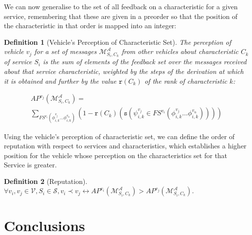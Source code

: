 \documentclass[compsoc, conference, letterpaper, 10pt, times]{IEEEtran}
\newtheorem{definition}{Definition}
\begin{document}
We can now generalise to the set of all feedback on a characteristic for a given service, remembering that these are given in a preorder so that the position of the characteristic in that order is mapped into an integer:


\begin{definition}[Vehicle's Perception of Characteristic Set]
The perception of vehicle $v_{j}$ for a set of messages $\mathcal{M}^{\mathcal{A}}_{S_{i},C_{k}}$ from other vehicles about characteristic $C_{k}$ of service $S_{i}$ is the sum of elements of the feedback set over the messages received about that service characteristic, weighted by the steps of the derivation at which it is obtained and further by the value $\mathtt{r}(C_{k})$ of the rank of characteristic $k$: 


\begin{displaymath}
\begin{array}{l}

AP^{v_{j}}(\mathcal{M}^{\mathcal{A}}_{S_{i}, C_{k}})=\\
\sum_{FS^{v_{i}}(\phi^{v_{j}}_{i,k}\dots \phi^{v_{n}}_{i,k})}
(1-\mathtt{r}(C_{k})(\mathtt{s}(\psi^{v_{j}}_{i,k} \in FS^{v_{i}}(\phi^{v_{j}}_{i,k}\dots \phi^{v_{n}}_{i,k}))))
\end{array}
\end{displaymath}

\end{definition}


Using the vehicle's perception of characteristic set, we can define the order of reputation with respect to services and characteristics, which establishes a higher position for the vehicle whose perception on the characteristics set for that Service is greater.

\begin{definition}[Reputation]
$\forall v_{i}, v_{j}\in \mathcal{V}, S_{i}\in \mathcal{S}, v_{i}\prec v_{j} \leftrightarrow AP^{v_{i}}(\mathcal{M}^{\mathcal{A}}_{S_{i}, C_{k}})>AP^{v_{j}}(\mathcal{M}^{\mathcal{A}}_{S_{i}, C_{k}})$.
\end{definition}

\section{Conclusions}
\end{document}
